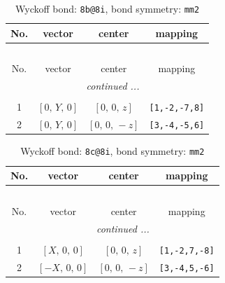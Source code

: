 \documentclass[fleqn,8pt]{jsarticle}
\begin{document}
\renewcommand{\arraystretch}{1.2}
\begin{longtable}{cccc}
\caption{Wyckoff bond: {\tt 8b@8i}, bond symmetry: {\tt mm2}}
 \\
 \hline \hline
No. & vector & center & mapping \\ \hline \endfirsthead

\multicolumn{3}{l}{\tablename\ \thetable{}} \\
 \hline \hline
No. & vector & center & mapping \\ \hline \endhead

 \hline \hline
\multicolumn{3}{r}{\footnotesize\it continued ...} \\ \endfoot

 \hline \hline
\multicolumn{3}{r}{} \\ \endlastfoot

1 & $\left[ 0,\, Y,\, 0 \right]$ & $\left[ 0,\, 0,\, z \right]$ & {\tt [1,-2,-7,8]} \\ \hline
2 & $\left[ 0,\, Y,\, 0 \right]$ & $\left[ 0,\, 0,\, - z \right]$ & {\tt [3,-4,-5,6]} \\
\end{longtable}
\renewcommand{\arraystretch}{1.2}
\begin{longtable}{cccc}
\caption{Wyckoff bond: {\tt 8c@8i}, bond symmetry: {\tt mm2}}
 \\
 \hline \hline
No. & vector & center & mapping \\ \hline \endfirsthead

\multicolumn{3}{l}{\tablename\ \thetable{}} \\
 \hline \hline
No. & vector & center & mapping \\ \hline \endhead

 \hline \hline
\multicolumn{3}{r}{\footnotesize\it continued ...} \\ \endfoot

 \hline \hline
\multicolumn{3}{r}{} \\ \endlastfoot

1 & $\left[ X,\, 0,\, 0 \right]$ & $\left[ 0,\, 0,\, z \right]$ & {\tt [1,-2,7,-8]} \\ \hline
2 & $\left[ - X,\, 0,\, 0 \right]$ & $\left[ 0,\, 0,\, - z \right]$ & {\tt [3,-4,5,-6]} \\
\end{longtable}
\renewcommand{\arraystretch}{1.2}
\end{document}

